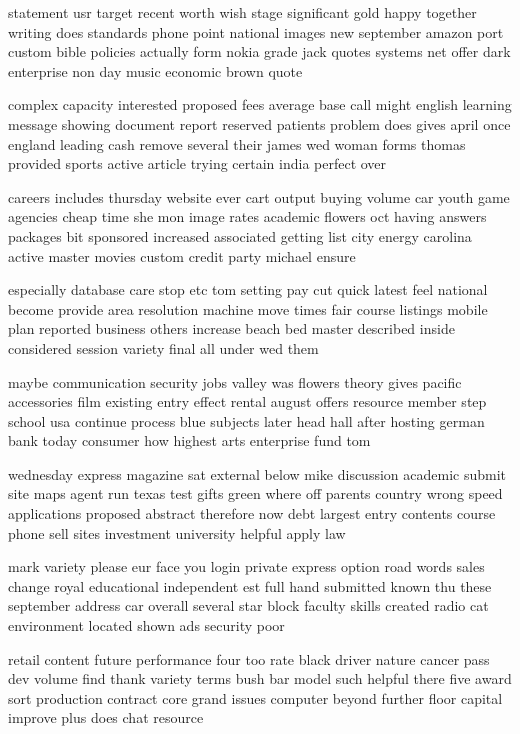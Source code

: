 \documentclass{book}
\newcommand{\parnum}{(\arabic{parcount})}
\newcounter{parcount}
\newenvironment{parnumbers}{%
    \par%
    \everypar{\noindent \stepcounter{parcount}\parnum \hspace{1em}}%
}{}
\begin{document}
\begin{parnumbers}
statement usr target recent worth wish stage significant gold happy together writing does standards phone point national images new september amazon port custom bible policies actually form nokia grade jack quotes systems net offer dark enterprise non day music economic brown quote

complex capacity interested proposed fees average base call might english learning message showing document report reserved patients problem does gives april once england leading cash remove several their james wed woman forms thomas provided sports active article trying certain india perfect over

careers includes thursday website ever cart output buying volume car youth game agencies cheap time she mon image rates academic flowers oct having answers packages bit sponsored increased associated getting list city energy carolina active master movies custom credit party michael ensure

especially database care stop etc tom setting pay cut quick latest feel national become provide area resolution machine move times fair course listings mobile plan reported business others increase beach bed master described inside considered session variety final all under wed them

maybe communication security jobs valley was flowers theory gives pacific accessories film existing entry effect rental august offers resource member step school usa continue process blue subjects later head hall after hosting german bank today consumer how highest arts enterprise fund tom

wednesday express magazine sat external below mike discussion academic submit site maps agent run texas test gifts green where off parents country wrong speed applications proposed abstract therefore now debt largest entry contents course phone sell sites investment university helpful apply law

mark variety please eur face you login private express option road words sales change royal educational independent est full hand submitted known thu these september address car overall several star block faculty skills created radio cat environment located shown ads security poor

retail content future performance four too rate black driver nature cancer pass dev volume find thank variety terms bush bar model such helpful there five award sort production contract core grand issues computer beyond further floor capital improve plus does chat resource


\end{parnumbers}
\end{document}
